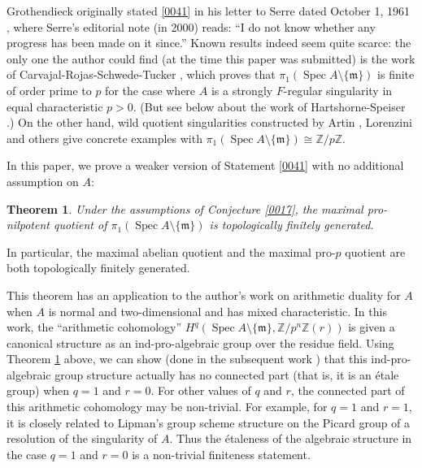 \documentclass{amsart}
\newtheorem{Thm}{Theorem}[section]
\theoremstyle{remark}
\numberwithin{equation}{section}
\newcommand{\Z}{\mathbb{Z}}
\newcommand{\ideal}[1]{\mathfrak{#1}}
\DeclareMathOperator{\Spec}{Spec}
\begin{document}
Grothendieck originally stated \eqref{0041}
in his letter to Serre dated October 1, 1961 \cite{CS01},
where Serre's editorial note (in 2000) reads:
``I do not know whether any progress has been made on it since.''
Known results indeed seem quite scarce:
the only one the author could find (at the time this paper was submitted)
is the work of Carvajal-Rojas-Schwede-Tucker \cite{CRST18},
which proves that
$\pi_{1}(\Spec A \setminus \{\ideal{m}\})$ is finite of order prime to $p$
for the case where $A$ is a strongly $F$-regular singularity in equal characteristic $p > 0$.
(But see below about the work of Hartshorne-Speiser \cite{HS77}.)
On the other hand, wild quotient singularities constructed by Artin \cite{Art75},
Lorenzini \cite[Corollary 6.14]{Lor14} and others
give concrete examples with $\pi_{1}(\Spec A \setminus \{\ideal{m}\}) \cong \Z / p \Z$.

In this paper, we prove a weaker version of Statement \eqref{0041}
with no additional assumption on $A$:

\begin{Thm} \label{0018}
	Under the assumptions of Conjecture \ref{0017},
	the maximal pro-nilpotent quotient of $\pi_{1}(\Spec A \setminus \{\ideal{m}\})$ is
	topologically finitely generated.
\end{Thm}

In particular, the maximal abelian quotient and
the maximal pro-$p$ quotient are both topologically finitely generated.

This theorem has an application to the author's work \cite{Suz24} on arithmetic duality for $A$
when $A$ is normal and two-dimensional and has mixed characteristic.
In this work, the ``arithmetic cohomology'' $H^{q}(\Spec A \setminus \{\ideal{m}\}, \Z / p^{n} \Z(r))$
is given a canonical structure as an ind-pro-algebraic group over the residue field.
Using Theorem \ref{0018} above, we can show (done in the subsequent work \cite{SuzExpl})
that this ind-pro-algebraic group structure
actually has no connected part (that is, it is an \'etale group) when $q = 1$ and $r = 0$.
For other values of $q$ and $r$, the connected part of this arithmetic cohomology may be non-trivial.
For example, for $q = 1$ and $r = 1$, it is closely related to
Lipman's group scheme structure \cite{Lip76}
on the Picard group of a resolution of the singularity of $A$.
Thus the \'etaleness of the algebraic structure in the case $q = 1$ and $r = 0$
is a non-trivial finiteness statement.
\end{document}
